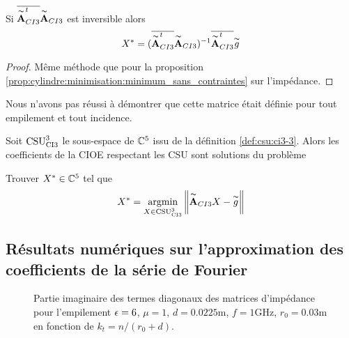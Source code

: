     \begin{prop}
      Si \(\conj{\tilde{\mA}_{CI3}^t}\tilde{\mA}_{CI3}\) est inversible alors
      \begin{equation*}
        X^* = (\conj{\tilde{\mA}_{CI3}^t}\tilde{\mA}_{CI3})^{-1}\conj{\tilde{\mA}_{CI3}^t}\tilde{g}
      \end{equation*}
    \end{prop}
    \begin{proof}
      Même méthode que pour la proposition \ref{prop:cylindre:minimisation:minimum_sans_contraintes} sur l'impédance.
    \end{proof}

    Nous n'avons pas réussi à démontrer que cette matrice était définie pour tout empilement et tout incidence.

    \begin{thm}

      Soit \(\CSU[3]{CI3}\) le sous-espace de \(\CC^5\) issu de la définition \ref{def:csu:ci3-3}.
      Alors les coefficients de la CIOE respectant les CSU sont solutions du problème

      Trouver \(X^* \in \CC^5\) tel que
      \begin{equation*}
        X^* = \argmin{X\in \CSU[3]{CI3}} \norm{\tilde{\mA}_{CI3}X - \tilde{g}}
      \end{equation*}
    \end{thm}

    \subsection{Résultats numériques sur l'approximation des coefficients de la série de Fourier}

    \begin{figure}[!hbt]
      \centering
      
      \caption[CIOE sur empilement de Hoppe & Rahmat-Samii p.~62]{Partie imaginaire des termes diagonaux des matrices d'impédance pour l'empilement \(\eps = 6\), \(\mu = 1\), \(d=0.0225\text{m}\), \(f=1\text{GHz}\), \(r_0=0.03\text{m}\) en fonction de \(k_t = n / (r_0+d)\).}
      \label{fig:imp_fourier:cylindre:hoppe:62:hoibc:mode_1}
    \end{figure}

